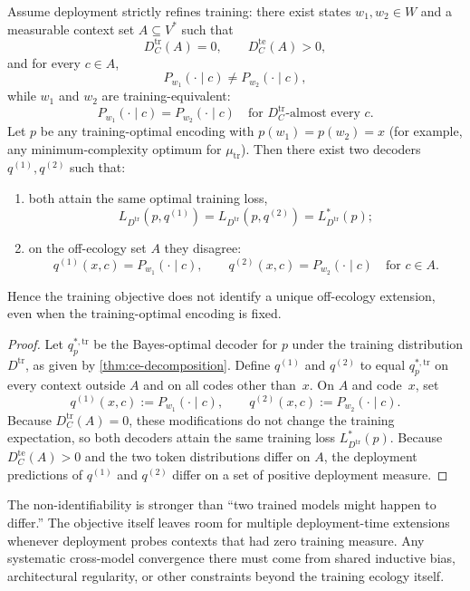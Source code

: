 \begin{proposition}\label{prop:off-ecology-nonident}
Assume deployment strictly refines training: there exist states $w_1,w_2 \in W$ and a measurable context set $A \subseteq V^*$ such that
\[
D_C^{\mathrm{tr}}(A)=0,
\qquad
D_C^{\mathrm{te}}(A)>0,
\]
and for every $c \in A$,
\[
P_{w_1}(\cdot \mid c) \neq P_{w_2}(\cdot \mid c),
\]
while $w_1$ and $w_2$ are training-equivalent:
\[
P_{w_1}(\cdot \mid c) = P_{w_2}(\cdot \mid c)
\quad \text{for } D_C^{\mathrm{tr}}\text{-almost every } c.
\]
Let $p$ be any training-optimal encoding with $p(w_1)=p(w_2)=x$ (for example, any minimum-complexity optimum for $\mu_{\mathrm{tr}}$). Then there exist two decoders $q^{(1)}, q^{(2)}$ such that:
\begin{enumerate}[label=(\alph*)]
\item both attain the same optimal training loss,
\[
L_{D^{\mathrm{tr}}}(p,q^{(1)}) = L_{D^{\mathrm{tr}}}(p,q^{(2)}) = L_{D^{\mathrm{tr}}}^*(p);
\]

\item on the off-ecology set $A$ they disagree:
\[
q^{(1)}(x,c) = P_{w_1}(\cdot \mid c),
\qquad
q^{(2)}(x,c) = P_{w_2}(\cdot \mid c)
\quad \text{for } c \in A.
\]
\end{enumerate}
Hence the training objective does not identify a unique off-ecology extension, even when the training-optimal encoding is fixed.
\end{proposition}

\begin{proof}
Let $q_p^{*,\mathrm{tr}}$ be the Bayes-optimal decoder for $p$ under the training distribution $D^{\mathrm{tr}}$, as given by \cref{thm:ce-decomposition}. Define $q^{(1)}$ and $q^{(2)}$ to equal $q_p^{*,\mathrm{tr}}$ on every context outside $A$ and on all codes other than~$x$. On $A$ and code~$x$, set
\[
q^{(1)}(x,c) := P_{w_1}(\cdot \mid c),
\qquad
q^{(2)}(x,c) := P_{w_2}(\cdot \mid c).
\]
Because $D_C^{\mathrm{tr}}(A)=0$, these modifications do not change the training expectation, so both decoders attain the same training loss $L_{D^{\mathrm{tr}}}^*(p)$. Because $D_C^{\mathrm{te}}(A)>0$ and the two token distributions differ on $A$, the deployment predictions of $q^{(1)}$ and $q^{(2)}$ differ on a set of positive deployment measure.
\end{proof}

\begin{interpretation}
The non-identifiability is stronger than ``two trained models might happen to differ.'' The objective itself leaves room for multiple deployment-time extensions whenever deployment probes contexts that had zero training measure. Any systematic cross-model convergence there must come from shared inductive bias, architectural regularity, or other constraints beyond the training ecology itself.
\end{interpretation}

